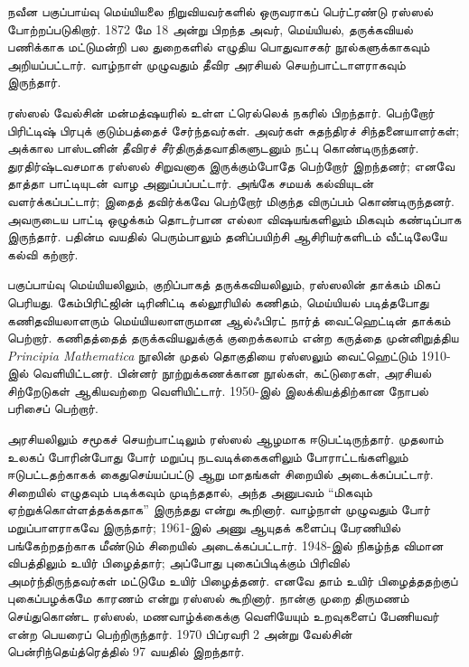 \documentclass[../../../include/open-logic-section]{subfiles}
\begin{document}



நவீன பகுப்பாய்வு மெய்யியலை நிறுவியவர்களில் ஒருவராகப் பெர்ட்ரண்டு
ரஸ்ஸல் போற்றப்படுகிறார். 1872 மே 18 அன்று பிறந்த அவர், மெய்யியல்,
தருக்கவியல் பணிக்காக மட்டுமன்றி பல துறைகளில் எழுதிய பொதுவாசகர்
நூல்களுக்காகவும் அறியப்பட்டார். வாழ்நாள் முழுவதும் தீவிர அரசியல்
செயற்பாட்டாளராகவும் இருந்தார்.

ரஸ்ஸல் வேல்சின் மன்மத்ஷயரில் உள்ள ட்ரெல்லெக் நகரில் பிறந்தார்.
பெற்றோர் பிரிட்டிஷ் பிரபுக் குடும்பத்தைச் சேர்ந்தவர்கள். அவர்கள்
சுதந்திரச் சிந்தனையாளர்கள்; அக்கால பாஸ்டனின் தீவிரச் சீர்திருத்தவாதிகளுடனும்
நட்பு கொண்டிருந்தனர். துரதிர்ஷ்டவசமாக ரஸ்ஸல் சிறுவனாக இருக்கும்போதே
பெற்றோர் இறந்தனர்; எனவே தாத்தா பாட்டியுடன் வாழ அனுப்பப்பட்டார். அங்கே
சமயக் கல்வியுடன் வளர்க்கப்பட்டார்; இதைத் தவிர்க்கவே பெற்றோர் மிகுந்த
விருப்பம் கொண்டிருந்தனர். அவருடைய பாட்டி ஒழுக்கம் தொடர்பான எல்லா
விஷயங்களிலும் மிகவும் கண்டிப்பாக இருந்தார். பதின்ம வயதில் பெரும்பாலும்
தனிப்பயிற்சி ஆசிரியர்களிடம் வீட்டிலேயே கல்வி கற்றார்.

பகுப்பாய்வு மெய்யியலிலும், குறிப்பாகத் தருக்கவியலிலும், ரஸ்ஸலின்
தாக்கம் மிகப் பெரியது. கேம்பிரிட்ஜின் டிரினிட்டி கல்லூரியில் கணிதம்,
மெய்யியல் படித்தபோது கணிதவியலாளரும் மெய்யியலாளருமான ஆல்ஃபிரட் நார்த்
வைட்ஹெட்டின் தாக்கம் பெற்றார். கணிதத்தைத் தருக்கவியலுக்குக் குறைக்கலாம்
என்ற கருத்தை முன்னிறுத்திய \emph{Principia Mathematica} நூலின் முதல்
தொகுதியை ரஸ்ஸலும் வைட்ஹெட்டும் 1910-இல் வெளியிட்டனர். பின்னர் நூற்றுக்கணக்கான
நூல்கள், கட்டுரைகள், அரசியல் சிற்றேடுகள் ஆகியவற்றை வெளியிட்டார்.
1950-இல் இலக்கியத்திற்கான நோபல் பரிசைப் பெற்றார்.

அரசியலிலும் சமூகச் செயற்பாட்டிலும் ரஸ்ஸல் ஆழமாக ஈடுபட்டிருந்தார்.
முதலாம் உலகப் போரின்போது போர் மறுப்பு நடவடிக்கைகளிலும் போராட்டங்களிலும்
ஈடுபட்டதற்காகக் கைதுசெய்யப்பட்டு ஆறு மாதங்கள் சிறையில் அடைக்கப்பட்டார்.
சிறையில் எழுதவும் படிக்கவும் முடிந்ததால், அந்த அனுபவம் ``மிகவும்
ஏற்றுக்கொள்ளத்தக்கதாக'' இருந்தது என்று கூறினார். வாழ்நாள் முழுவதும்
போர் மறுப்பாளராகவே இருந்தார்; 1961-இல் அணு ஆயுதக் களைப்பு
பேரணியில் பங்கேற்றதற்காக மீண்டும் சிறையில் அடைக்கப்பட்டார். 1948-இல்
நிகழ்ந்த விமான விபத்திலும் உயிர் பிழைத்தார்; அப்போது புகைப்பிடிக்கும்
பிரிவில் அமர்ந்திருந்தவர்கள் மட்டுமே உயிர் பிழைத்தனர். எனவே தாம்
உயிர் பிழைத்ததற்குப் புகைப்பழக்கமே காரணம் என்று ரஸ்ஸல் கூறினார்.
நான்கு முறை திருமணம் செய்துகொண்ட ரஸ்ஸல், மணவாழ்க்கைக்கு வெளியேயும்
உறவுகளைப் பேணியவர் என்ற பெயரைப் பெற்றிருந்தார். 1970 பிப்ரவரி 2 அன்று
வேல்சின் பென்ரிந்தெய்த்ரெத்தில் 97 வயதில் இறந்தார்.
\end{document}
